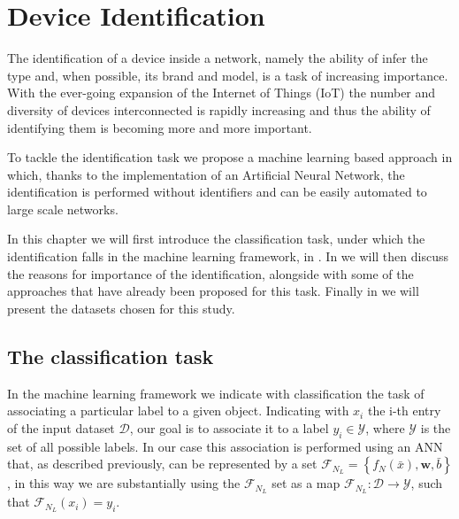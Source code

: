 \chapter{Device Identification}\label{chap3}

The identification of a device inside a network, namely the ability of infer the type
and, when possible, its brand and model, is a task of increasing importance. With the ever-going expansion of the Internet of Things (IoT)\cite{iot_2020} the number and diversity of devices interconnected is rapidly increasing and thus the ability of identifying them is becoming more and more important.

To tackle the identification task we propose a machine learning based approach in which, thanks to the implementation of an Artificial Neural Network, the identification is performed without identifiers and can be easily automated to large scale networks. 

In this chapter we will first introduce the classification task, under which the identification falls in the machine learning framework, in . In  we will then discuss the reasons for importance of the identification, alongside with some of the approaches that have already been proposed for this task. Finally in  we will present the datasets chosen for this study.

\newpage
\section{The classification task}\label{classification}

In the machine learning framework we indicate with classification the task of associating a particular label to a given object. 
Indicating with $x_i$ the i-th entry of the input dataset $\mathcal{D}$, our goal is to associate it to a label $y_i\in\mathcal{Y}$, where $\mathcal{Y}$ is the set of all possible labels. In our case this association is performed using an ANN that, as described previously, can be represented by a set $\mathcal{F}_{N_L} = \left\{ f_N(\bar{x}), \boldsymbol{w}, \bar{b}\right\}$, in this way we are substantially using the $\mathcal{F}_{N_L}$ set as a map
$\mathcal{F}_{N_L}: \mathcal{D} \to  \mathcal{Y}$, such that $\mathcal{F}_{N_L}(x_i)=y_i$.

